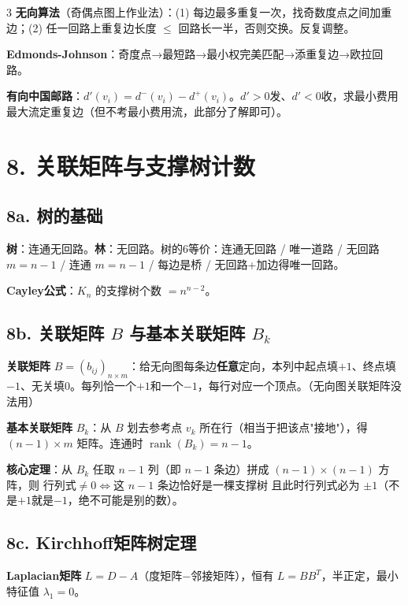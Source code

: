 \documentclass[10pt,a4paper,landscape]{ctexart}
\begin{document}
\begin{multicols}{3}
\textbf{无向算法}（奇偶点图上作业法）：(1) 每边最多重复一次，找奇数度点之间加重边；(2) 任一回路上重复边长度 $\leq$ 回路长一半，否则交换。反复调整。

\textbf{Edmonds-Johnson}：奇度点→最短路→最小权完美匹配→添重复边→欧拉回路。

\textbf{有向中国邮路}：$d'(v_i)=d^-(v_i)-d^+(v_i)$。$d'>0$发、$d'<0$收，求最小费用最大流定重复边（但不考最小费用流，此部分了解即可）。

\section*{8. 关联矩阵与支撑树计数}

\subsection*{8a. 树的基础}

\textbf{树}：连通无回路。\textbf{林}：无回路。树的6等价：连通无回路 / 唯一道路 / 无回路 $m=n-1$ / 连通 $m=n-1$ / 每边是桥 / 无回路+加边得唯一回路。

\textbf{Cayley公式}：$K_n$ 的支撑树个数 $=n^{n-2}$。

\subsection*{8b. 关联矩阵 $B$ 与基本关联矩阵 $B_k$}

\textbf{关联矩阵} $B=(b_{ij})_{n\times m}$：给无向图每条边\textbf{任意}定向，本列中起点填$+1$、终点填$-1$、无关填$0$。每列恰一个$+1$和一个$-1$，每行对应一个顶点。（无向图关联矩阵没法用）

\textbf{基本关联矩阵} $B_k$：从 $B$ 划去参考点 $v_k$ 所在行（相当于把该点"接地"），得 $(n-1)\times m$ 矩阵。连通时 $\boxed{\operatorname{rank}(B_k)=n-1}$。

\textbf{核心定理}：从 $B_k$ 任取 $n-1$ 列（即 $n-1$ 条边）拼成 $(n-1)\times(n-1)$ 方阵，则
$\boxed{\text{行列式}\neq0 \iff \text{这 }n-1\text{ 条边恰好是一棵支撑树}}$
且此时行列式必为 $\pm1$（不是$+1$就是$-1$，绝不可能是别的数）。

\subsection*{8c. Kirchhoff矩阵树定理}

\textbf{Laplacian矩阵} $L=D-A$（度矩阵$-$邻接矩阵），恒有 $L=BB^T$，半正定，最小特征值 $\lambda_1=0$。


\end{multicols}
\end{document}
